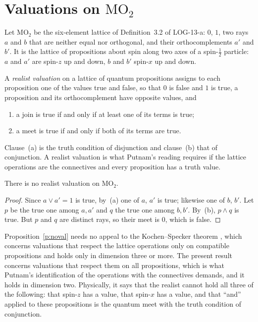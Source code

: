 \documentclass{situationist-preprint}
\begin{document}
\section{Valuations on $\mathrm{MO}_2$}

Let $\mathrm{MO}_2$ be the six-element lattice of Definition~3.2 of LOG-13-a: $0$, $1$, two rays $a$ and $b$ that are neither equal nor orthogonal, and their orthocomplements $a'$ and $b'$. It is the lattice of propositions about spin along two axes of a spin-$\frac12$ particle: $a$ and $a'$ are spin-$z$ up and down, $b$ and $b'$ spin-$x$ up and down.

\begin{definition}\label{d:val}
A \emph{realist valuation} on a lattice of quantum propositions assigns to each proposition one of the values true and false, so that $0$ is false and $1$ is true, a proposition and its orthocomplement have opposite values, and
\begin{enumerate}[label=(\alph*)]
\item a join is true if and only if at least one of its terms is true;
\item a meet is true if and only if both of its terms are true.
\end{enumerate}
\end{definition}

Clause~(a) is the truth condition of disjunction and clause~(b) that of conjunction. A realist valuation is what Putnam's reading requires if the lattice operations are the connectives and every proposition has a truth value.

\begin{proposition}\label{p:noval}
There is no realist valuation on $\mathrm{MO}_2$.
\end{proposition}

\begin{proof}
Since $a \vee a' = 1$ is true, by~(a) one of $a$, $a'$ is true; likewise one of $b$, $b'$. Let $p$ be the true one among $a, a'$ and $q$ the true one among $b, b'$. By~(b), $p \wedge q$ is true. But $p$ and $q$ are distinct rays, so their meet is $0$, which is false.
\end{proof}

Proposition~\ref{p:noval} needs no appeal to the Kochen--Specker theorem \citep{KochenSpecker1967}, which concerns valuations that respect the lattice operations only on compatible propositions and holds only in dimension three or more. The present result concerns valuations that respect them on all propositions, which is what Putnam's identification of the operations with the connectives demands, and it holds in dimension two. Physically, it says that the realist cannot hold all three of the following: that spin-$z$ has a value, that spin-$x$ has a value, and that \enquote{and} applied to these propositions is the quantum meet with the truth condition of conjunction.
\end{document}

